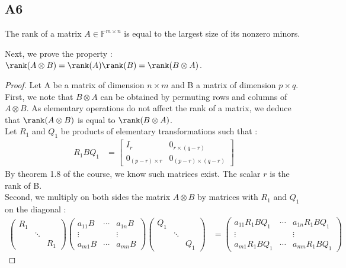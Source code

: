 \documentclass[11pt]{article}
\newcommand{\field}{\mathbb{F}} %
\newcommand{\kp}{\otimes} %
\begin{document}
\subsection*{A6}
The rank of a matrix \(A \in \field^{m \times n}\) is equal to the largest size of its nonzero minors.

Next, we prove the property : $\rank(A\kp B)=\rank(A)\rank(B)=\rank(B\kp A)$.

\begin{proof}
Let A be a matrix of dimension $n\times m$ and B a matrix of dimension $p\times q$.\\
First, we note that $B\kp A$ can be obtained by permuting rows and columns of $A\kp B$. As elementary operations do not affect the rank of a matrix, we deduce that $\rank(A\kp B)$ is equal to $\rank(B\kp A)$.\\
Let $R_1$ and $Q_1$ be products of elementary transformations such that :
\begin{align*}
    R_1BQ_1 &=\begin{bmatrix}
    I_r & 0_{r\times(q-r)}\\
    0_{(p-r)\times r} & 0_{(p-r)\times (q-r)}
    \end{bmatrix}
\end{align*}
By theorem 1.8 of the course, we know such matrices exist. The scalar $r$ is the rank of B.\\
Second, we multiply on both sides the matrix $A\kp B$ by matrices with $R_1$ and $Q_1$ on the diagonal :
\begin{align*}
    \begin{pmatrix}
    R_1 & &\\
    & \ddots & \\
    & & R_1
    \end{pmatrix}
    \begin{pmatrix}
    a_{11}B & \cdots & a_{1n}B\\
    \vdots & & \vdots\\
    a_{m1}B & \cdots & a_{mn}B
    \end{pmatrix}
    \begin{pmatrix}
    Q_1 & &\\
    & \ddots & \\
    & & Q_1
    \end{pmatrix}
    &= \begin{pmatrix}
    a_{11}R_1BQ_1 & \cdots & a_{1n}R_1BQ_1\\
    \vdots & & \vdots\\
    a_{m1}R_1BQ_1 & \cdots & a_{mn}R_1BQ_1

\end{pmatrix}
\end{align*}
\end{proof}
\end{document}
